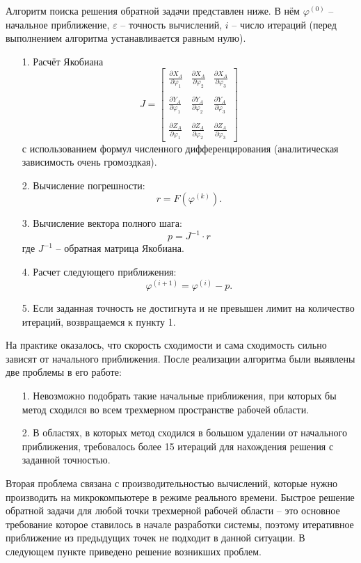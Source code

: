 Алгоритм поиска решения обратной задачи представлен ниже. В нём $ \varphi^{(0)} $ -- начальное приближение, $ \varepsilon $ -- точность вычислений, $ i $ -- число итераций (перед выполнением алгоритма устанавливается равным нулю).
\begin{itemize}
    \item[1.] Расчёт Якобиана $$ J = \begin{bmatrix}
        \frac{\partial X_A}{\partial \varphi_1} & 
        \frac{\partial X_A}{\partial \varphi_2} & 
        \frac{\partial X_A}{\partial \varphi_3} \\ \\
        \frac{\partial Y_A}{\partial \varphi_1} & 
        \frac{\partial Y_A}{\partial \varphi_2} & 
        \frac{\partial Y_A}{\partial \varphi_3} \\ \\
        \frac{\partial Z_A}{\partial \varphi_1} & 
        \frac{\partial Z_A}{\partial \varphi_2} & 
        \frac{\partial Z_A}{\partial \varphi_3}
    \end{bmatrix} $$ с использованием формул численного дифференцирования (аналитическая зависимость очень громоздкая).
    \item[2.] Вычисление погрешности: $$ r=F(\varphi^{(k)}). $$
    \item[3.] Вычисление вектора полного шага: $$ p = J^{-1} \cdot r $$ где $ J^{-1} $ -- обратная матрица Якобиана.
    \item[4.] Расчет следующего приближения: $$ \varphi^{(i+1)}=\varphi^{(i)} - p. $$ 
    \item[5.] Если заданная точность не достигнута и не превышен лимит на количество итераций, возвращаемся к пункту 1.
\end{itemize}

\noindent На практике оказалось, что скорость сходимости и сама сходимость сильно зависят от начального приближения. После реализации алгоритма были выявлены две проблемы в его работе:
\begin{itemize}
    \item[1.] Невозможно подобрать такие начальные приближения, при которых бы метод сходился во всем трехмерном пространстве рабочей области.
    \item[2.] В областях, в которых метод сходился в большом удалении от начального приближения, требовалось более 15 итераций для нахождения решения с заданной точностью.
\end{itemize}

\noindent Вторая проблема связана с производительностью вычислений, которые нужно производить на микрокомпьютере в режиме реального времени. Быстрое решение обратной задачи для любой точки трехмерной рабочей области -- это основное требование которое ставилось в начале разработки системы, поэтому итеративное приближение из предыдущих точек не  подходит в данной ситуации. В следующем пункте приведено решение возникших проблем.

